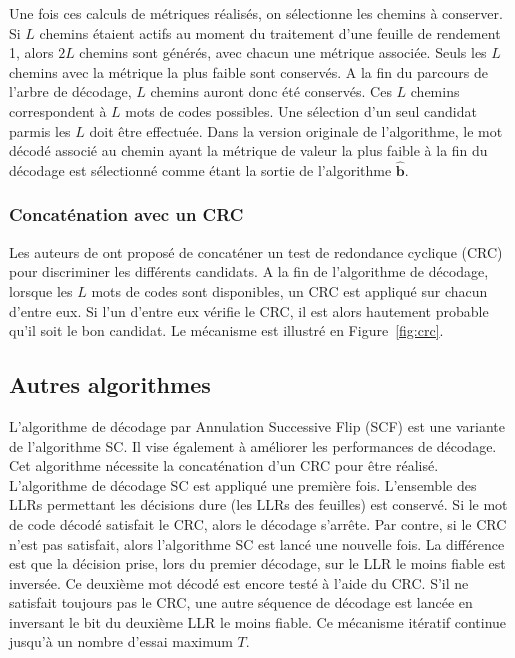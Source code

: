 Une fois ces calculs de métriques réalisés, on sélectionne les chemins à conserver. Si $L$ chemins étaient actifs au moment du traitement d'une feuille de rendement 1, alors $2L$ chemins sont générés, avec chacun une métrique associée. Seuls les $L$ chemins avec la métrique la plus faible sont conservés. A la fin du parcours de l'arbre de décodage, $L$ chemins auront donc été conservés. Ces $L$ chemins correspondent à $L$ mots de codes possibles. Une sélection d'un seul candidat parmis les $L$ doit être effectuée. Dans la version originale de l'algorithme, le mot décodé associé au chemin ayant la métrique de valeur la plus faible à la fin du décodage est sélectionné comme étant la sortie de l'algorithme $\mathbold{\hat{b}}$.

\subsubsection{Concaténation avec un CRC}
Les auteurs de \cite{tal_how_2013} ont proposé de concaténer un test de redondance cyclique (CRC) pour discriminer les différents candidats. A la fin de l'algorithme de décodage, lorsque les $L$ mots de codes sont disponibles, un CRC est appliqué sur chacun d'entre eux. Si l'un d'entre eux vérifie le CRC, il est alors hautement probable qu'il soit le bon candidat. Le mécanisme est illustré en Figure~\ref{fig:crc}.


\subsection{Autres algorithmes}
	L'algorithme de décodage par Annulation Successive Flip (SCF) \cite{afisiadis_low-complexity_2014} est une variante de l'algorithme SC. Il vise également à améliorer les performances de décodage. Cet algorithme nécessite la concaténation d'un CRC pour être réalisé. L'algorithme de décodage SC est appliqué une première fois. L'ensemble des LLRs permettant les décisions dure (les LLRs des feuilles) est conservé. Si le mot de code décodé satisfait le CRC, alors le décodage s'arrête. Par contre, si le CRC n'est pas satisfait, alors l'algorithme SC est lancé une nouvelle fois. La différence est que la décision prise, lors du premier décodage, sur le LLR le moins fiable est inversée. Ce deuxième mot décodé est encore testé à l'aide du CRC. S'il ne satisfait toujours pas le CRC, une autre séquence de décodage est lancée en inversant le bit du deuxième LLR le moins fiable. Ce mécanisme itératif continue jusqu'à un nombre d'essai maximum $T$.


